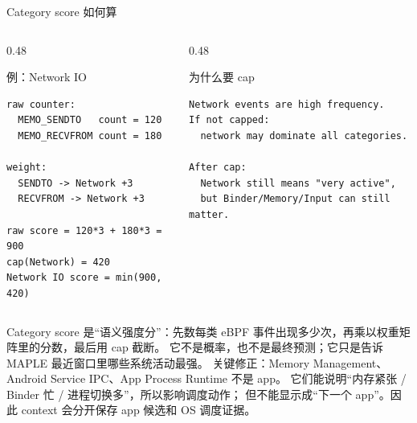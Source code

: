\documentclass[UTF8,aspectratio=169,10pt]{ctexbeamer}
\begin{document}
\begin{frame}[fragile]{Category score 如何算}
  \begin{columns}[T,totalwidth=\textwidth]
    \begin{column}{0.48\textwidth}
      \begin{block}{例：Network IO}
\begin{lstlisting}
raw counter:
  MEMO_SENDTO   count = 120
  MEMO_RECVFROM count = 180

weight:
  SENDTO -> Network +3
  RECVFROM -> Network +3

raw score = 120*3 + 180*3 = 900
cap(Network) = 420
Network IO score = min(900, 420)
\end{lstlisting}
      \end{block}
    \end{column}
    \begin{column}{0.48\textwidth}
      \begin{block}{为什么要 cap}
\begin{lstlisting}
Network events are high frequency.
If not capped:
  network may dominate all categories.

After cap:
  Network still means "very active",
  but Binder/Memory/Input can still matter.
\end{lstlisting}
      \end{block}
    \end{column}
  \end{columns}
  \vspace{0.35em}
  {\scriptsize
  Category score 是“语义强度分”：先数每类 eBPF 事件出现多少次，再乘以权重矩阵里的分数，最后用 cap 截断。
  它不是概率，也不是最终预测；它只是告诉 MAPLE 最近窗口里哪些系统活动最强。
  }
  \vspace{0.2em}
  {\scriptsize\color{memoGray}
  关键修正：Memory Management、Android Service IPC、App Process Runtime 不是 app。
  它们能说明“内存紧张 / Binder 忙 / 进程切换多”，所以影响调度动作；
  但不能显示成“下一个 app”。因此 context 会分开保存 app 候选和 OS 调度证据。
  }
\end{frame}
\end{document}
